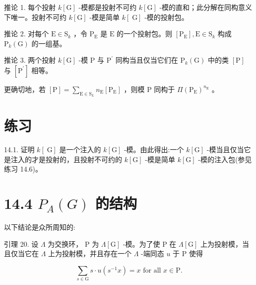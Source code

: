 \documentclass[10pt]{article}
\begin{document}
推论 1. 每个投射 \(k\left\lbrack  \mathrm{G}\right\rbrack\) -模都是投射不可约 \(k\left\lbrack  \mathrm{G}\right\rbrack\) -模的直和；此分解在同构意义下唯一。投射不可约 \(k\left\lbrack  \mathrm{G}\right\rbrack\) -模是简单 \(k\left\lbrack  \mathrm{\;G}\right\rbrack\) -模的投射包。

推论 2. 对每个 \(\mathrm{E} \in  {\mathrm{S}}_{k}\) ，令 \({\mathrm{P}}_{\mathrm{E}}\) 是 \(\mathrm{E}\) 的一个投射包。则 \(\left\lbrack  {\mathrm{P}}_{\mathrm{E}}\right\rbrack  ,\mathrm{E} \in  {\mathrm{S}}_{k}\) 构成 \({\mathrm{P}}_{k}\left( \mathrm{G}\right)\) 的一组基。

推论 3. 两个投射 \(k\left\lbrack  \mathrm{G}\right\rbrack\) -模 \(\mathrm{P}\) 与 \({\mathrm{P}}^{\prime }\) 同构当且仅当它们在 \({\mathrm{P}}_{k}\left( \mathrm{G}\right)\) 中的类 \(\left\lbrack  \mathrm{P}\right\rbrack\) 与 \(\left\lbrack  {\mathrm{P}}^{\prime }\right\rbrack\) 相等。

更确切地，若 \(\left\lbrack  \mathrm{P}\right\rbrack   = \mathop{\sum }\limits_{{\mathrm{E} \in  {\mathrm{S}}_{L}}}{n}_{\mathrm{E}}\left\lbrack  {\mathrm{P}}_{\mathrm{E}}\right\rbrack\) ，则模 \(\mathrm{P}\) 同构于 \(\Pi {\left( {\mathrm{P}}_{\mathrm{E}}\right) }^{{n}_{\mathrm{E}}}\) 。

\section*{练习}

14.1. 证明 \(k\left\lbrack  \mathrm{\;G}\right\rbrack\) 是一个注入的 \(k\left\lbrack  \mathrm{G}\right\rbrack\) -模。由此得出:一个 \(k\left\lbrack  \mathrm{G}\right\rbrack\) -模当且仅当它是注入的才是投射的，且投射不可约的 \(k\left\lbrack  \mathrm{G}\right\rbrack\) -模是简单 \(k\left\lbrack  \mathrm{G}\right\rbrack\) -模的注入包(参见练习 14.6)。

\section*{14.4 \({P}_{A}\left( G\right)\) 的结构}

以下结论是众所周知的:

引理 20. 设 \(\Lambda\) 为交换环， \(\mathrm{P}\) 为 \(\Lambda \left\lbrack  \mathrm{G}\right\rbrack\) -模。为了使 P 在 \(\Lambda \left\lbrack  \mathrm{G}\right\rbrack\) 上为投射模，当且仅当它在 \(\Lambda\) 上为投射模，并且存在一个 \(\Lambda\) -端同态 \(u\) 于 \(\mathrm{P}\) 使得

\[
\mathop{\sum }\limits_{{s \in  \mathrm{G}}}s \cdot  u\left( {{s}^{-1}x}\right)  = x\text{ for all }x \in  \mathrm{P}.
\]
\end{document}
